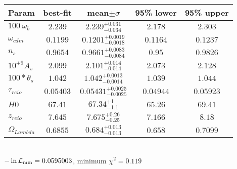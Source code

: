 \begin{tabular}{|l|c|c|c|c|} 
 \hline 
Param & best-fit & mean$\pm\sigma$ & 95\% lower & 95\% upper \\ \hline 
$100~\omega{}_{b }$ &$2.239$ & $2.239_{-0.034}^{+0.031}$ & $2.178$ & $2.303$ \\ 
$\omega{}_{cdm }$ &$0.1199$ & $0.1201_{-0.0018}^{+0.0019}$ & $0.1164$ & $0.1237$ \\ 
$n_{s }$ &$0.9654$ & $0.9661_{-0.0084}^{+0.0083}$ & $0.95$ & $0.9826$ \\ 
$10^{+9}A_{s }$ &$2.099$ & $2.101_{-0.014}^{+0.014}$ & $2.073$ & $2.128$ \\ 
$100*\theta{}_{s }$ &$1.042$ & $1.042_{-0.0014}^{+0.0013}$ & $1.039$ & $1.044$ \\ 
$\tau{}_{reio }$ &$0.05403$ & $0.05431_{-0.0025}^{+0.0025}$ & $0.04944$ & $0.05923$ \\ 
$H0$ &$67.41$ & $67.34_{-1.1}^{+1}$ & $65.26$ & $69.41$ \\ 
$z_{reio }$ &$7.645$ & $7.675_{-0.25}^{+0.26}$ & $7.166$ & $8.18$ \\ 
$\Omega{}_{Lambda }$ &$0.6855$ & $0.684_{-0.013}^{+0.013}$ & $0.658$ & $0.7099$ \\ 
\hline 
 \end{tabular} \\ 
$-\ln{\cal L}_\mathrm{min} =0.0595003$, minimum $\chi^2=0.119$ \\ 
